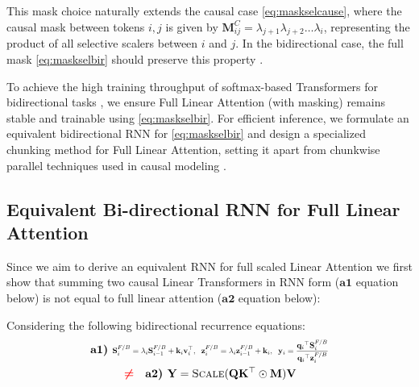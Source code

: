 This mask choice naturally extends the causal case \cref{eq:maskselcause}, where the causal mask between tokens \(i, j\) is given by \(\mathbf{M}^C_{ij} = \lambda_{j+1} \lambda_{j+2} \dots \lambda_i\), representing the product of all selective scalers between \(i\) and \(j\). In the bidirectional case, the full mask \cref{eq:maskselbir} should preserve this property \cite{hwang2024hydrabidirectionalstatespace}.

To achieve the high training throughput of softmax-based Transformers for bidirectional tasks \cite{vit,deit,Beltagy2020Longformer}, we ensure Full Linear Attention (with masking) remains stable and trainable using \cref{eq:maskselbir}. For efficient inference, we formulate an equivalent bidirectional RNN for \cref{eq:maskselbir} and design a specialized chunking method for Full Linear Attention, setting it apart from chunkwise parallel techniques used in causal modeling \cite{yang2023gated,deltanet}.



\subsection{Equivalent Bi-directional RNN for Full Linear Attention} \label{sec:rnn}

Since we aim to derive an equivalent RNN for full scaled Linear Attention we first show that summing two causal Linear Transformers in RNN form ($\mathbf{a1}$ equation below) is not equal to full linear attention ($\mathbf{a2}$ equation below):

\begin{observation}
\label{obs:notbidirection}
Considering the following bidirectional recurrence equations:
\begin{align}
      & \textbf{a1) } \scalemath{0.7}{{\mathbf{S}}_i^{F/B} = {{\lambda_i}} {\mathbf{S}}_{i-1}^{F/B} + \mathbf{k}_i \mathbf{v}_i^{\top}, \hspace{2mm}
   {\mathbf{z}}_i^{F/B} = {{\lambda_i}} {\mathbf{z}}_{i-1}^{F/B} + {\mathbf{k}_i}, \hspace{1mm}
    \hspace{1mm} \mathbf{y}_i= \frac{{{\mathbf{q}_i}}^{\top} {\mathbf{S}}_i^{F/B}}{{{\mathbf{q}_i}}^{\top} {\mathbf{z}_i^{F/B}}}} \\
     & \quad \quad \quad \textcolor{red}{\Large \boldsymbol{\ne}} \quad \textbf{a2) }\mathbf{Y} = \textsc{Scale}(\mathbf{Q}\mathbf{K}^\top \odot \mathbf{M}) \mathbf{V} \label{eq:fullattlin}
\end{align}
\end{observation}

